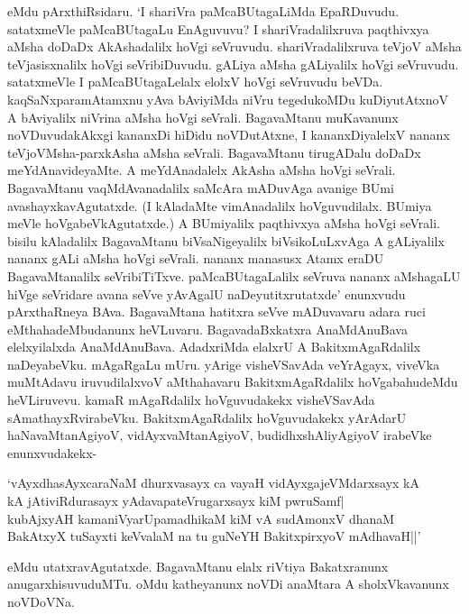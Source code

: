 \noindent eMdu pArxthiRsidaru. `I shariVra paMcaBUtagaLiMda EpaRDuvudu. satatxmeVle paMcaBUtagaLu EnAguvuvu? I shariVradalilxruva paqthivxya aMsha doDaDx AkAshadalilx hoVgi seVruvudu. shariVradalilxruva teVjoV aMsha teVjasisxnalilx hoVgi seVribiDuvudu. gALiya aMsha gALiyalilx hoVgi seVruvudu. satatxmeVle I paMcaBUtagaLelalx elolxV hoVgi seVruvudu beVDa. kaqSaNxparamAtamxnu yAva bAviyiMda niVru tegedukoMDu kuDiyutAtxnoV A bAviyalilx niVrina aMsha hoVgi seVrali. BagavaMtanu muKavanunx noVDuvudakAkxgi kananxDi hiDidu noVDutAtxne, I kananxDiyalelxV nananx teVjoVMsha-parxkAsha aMsha seVrali. BagavaMtanu tirugADalu doDaDx meYdAnavideyaMte. A meYdAnadalelx AkAsha aMsha hoVgi seVrali. BagavaMtanu vaqMdAvanadalilx saMcAra mADuvAga avanige BUmi avashayxkavAgutatxde. (I kAladaMte vimAnadalilx hoVguvudilalx. BUmiya meVle hoVgabeVkAgutatxde.) A BUmiyalilx paqthivxya aMsha hoVgi seVrali. bisilu kAladalilx BagavaMtanu biVsaNigeyalilx biVsikoLuLxvAga A gALiyalilx nananx gALi aMsha hoVgi seVrali. nananx manasusx Atamx eraDU BagavaMtanalilx seVribiTiTxve. paMcaBUtagaLalilx seVruva nananx aMshagaLU hiVge seVridare avana seVve yAvAgalU naDeyutitxrutatxde' enunxvudu pArxthaRneya BAva. BagavaMtana hatitxra seVve mADuvavaru adara ruci eMthahadeMbudanunx heVLuvaru. BagavadaBxkatxra AnaMdAnuBava elelxyilalxda AnaMdAnuBava. AdadxriMda elalxrU A BakitxmAgaRdalilx naDeyabeVku. mAgaRgaLu mUru. yArige visheVSavAda veYrAgayx, viveVka muMtAdavu iruvudilalxvoV aMthahavaru BakitxmAgaRdalilx hoVgabahudeMdu heVLiruvevu. kamaR mAgaRdalilx hoVguvudakekx visheVSavAda sAmathayxRvirabeVku. BakitxmAgaRdalilx hoVguvudakekx yArAdarU haNavaMtanAgiyoV, vidAyxvaMtanAgiyoV, budidhxshAliyAgiyoV irabeVke enunxvudakekx-

\begin{shloka}
`vAyxdhasAyxcaraNaM dhurxvasayx ca vayaH vidAyxgajeVMdarxsayx kA\\
kA jAtiviRdurasayx yAdavapateVrugarxsayx kiM pwruSamf|\\
kubAjxyAH kamaniVyarUpamadhikaM kiM vA sudAmonxV dhanaM\\
BakAtxyX tuSayxti keVvalaM na tu guNeYH BakitxpirxyoV mAdhavaH||'
\end{shloka}

\noindent eMdu utatxravAgutatxde. BagavaMtanu elalx riVtiya Bakatxranunx anugarxhisuvuduMTu. oMdu katheyanunx noVDi anaMtara A sholxVkavanunx noVDoVNa.

